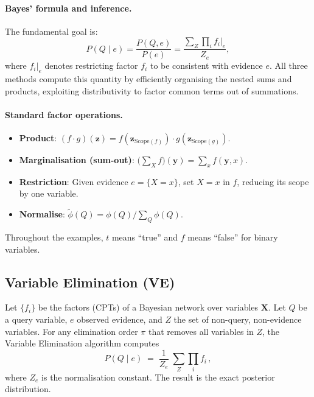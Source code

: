 \paragraph{Bayes' formula and inference.}
The fundamental goal is:
\[
\boxed{P(Q\mid e)=\frac{P(Q,e)}{P(e)}
      =\frac{\displaystyle\sum_Z\prod_i f_i\big|_e}{Z_e}},
\]
where $f_i\big|_e$ denotes restricting factor $f_i$ to be consistent with
evidence $e$. All three methods compute this quantity by efficiently
organising the nested sums and products, exploiting distributivity to
factor common terms out of summations.

\paragraph{Standard factor operations.}
\begin{itemize}
\item \textbf{Product}: $(f\cdot g)(\mathbf{z})
      =f(\mathbf{z}_{\mathrm{Scope}(f)})\cdot g(\mathbf{z}_{\mathrm{Scope}(g)})$.
\item \textbf{Marginalisation (sum-out)}:
      $\bigl(\sum_X f\bigr)(\mathbf{y})=\sum_x f(\mathbf{y},x)$.
\item \textbf{Restriction}: Given evidence $e=\{X=x\}$, set $X=x$ in $f$,
      reducing its scope by one variable.
\item \textbf{Normalise}: $\tilde\phi(Q)=\phi(Q)/\sum_Q\phi(Q)$.
\end{itemize}

Throughout the examples, $t$ means ``true'' and $f$ means ``false'' for
binary variables.

\subsection{Variable Elimination (VE)}

\begin{theorem}
Let $\{f_i\}$ be the factors (CPTs) of a Bayesian network over variables
$\mathbf{X}$. Let $Q$ be a query variable, $e$ observed evidence, and $Z$
the set of non-query, non-evidence variables. For any elimination order
$\pi$ that removes all variables in $Z$, the Variable Elimination algorithm
computes
\[
P(Q\mid e) \;=\; \frac{1}{Z_e}\;\sum_{Z}\prod_i f_i\,,
\]
where $Z_e$ is the normalisation constant. The result is the exact posterior
distribution.
\end{theorem}

